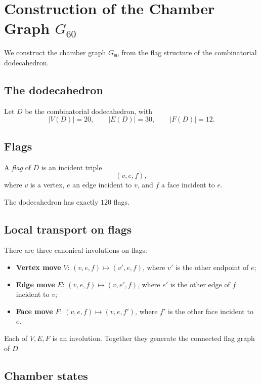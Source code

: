 \section{Construction of the Chamber Graph $G_{60}$}

We construct the chamber graph $G_{60}$ from the flag structure of the
combinatorial dodecahedron.

\subsection{The dodecahedron}

Let $D$ be the combinatorial dodecahedron, with
\[
|V(D)| = 20, \qquad |E(D)| = 30, \qquad |F(D)| = 12.
\]

\subsection{Flags}

A \emph{flag} of $D$ is an incident triple
\[
(v,e,f),
\]
where $v$ is a vertex, $e$ an edge incident to $v$, and $f$ a face
incident to $e$.

The dodecahedron has exactly $120$ flags.

\subsection{Local transport on flags}

There are three canonical involutions on flags:

\begin{itemize}
\item \textbf{Vertex move} $V$: $(v,e,f) \mapsto (v',e,f)$, where $v'$
is the other endpoint of $e$;

\item \textbf{Edge move} $E$: $(v,e,f) \mapsto (v,e',f)$, where $e'$
is the other edge of $f$ incident to $v$;

\item \textbf{Face move} $F$: $(v,e,f) \mapsto (v,e,f')$, where $f'$
is the other face incident to $e$.
\end{itemize}

Each of $V,E,F$ is an involution. Together they generate the connected
flag graph of $D$.

\subsection{Chamber states}

